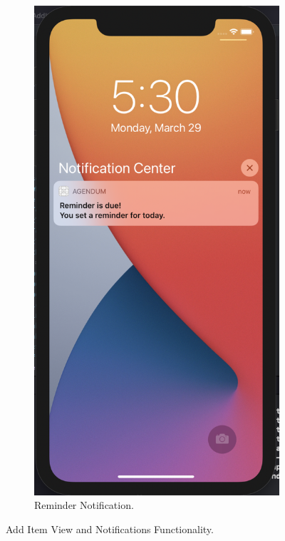 \begin{figure}[H]
\begin{subfigure}[b]{0.3\textwidth}
        \label{fig:notifications_alert_app}
    \end{subfigure}
    \hfill
    \begin{subfigure}[b]{0.3\textwidth}
        \centering
        \includegraphics[width=\textwidth]{./graphics/Implementation/Add Item/notification recieved.png}
        \caption{Reminder Notification.}
        \label{fig:notification_recieved_app}
    \end{subfigure}
    
    \caption{Add Item View and Notifications Functionality.}
    \label{fig:add_item_notifications}
\end{figure}